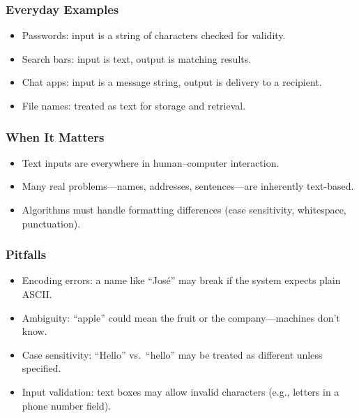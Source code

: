 \documentclass[
  letterpaper,
  DIV=11,
  numbers=noendperiod]{scrreprt}
\providecommand{\tightlist}{%
  \setlength{\itemsep}{0pt}\setlength{\parskip}{0pt}}
\begin{document}
\subsubsection{Everyday Examples}\label{everyday-examples-11}

\begin{itemize}
\tightlist
\item
  Passwords: input is a string of characters checked for validity.
\item
  Search bars: input is text, output is matching results.
\item
  Chat apps: input is a message string, output is delivery to a
  recipient.
\item
  File names: treated as text for storage and retrieval.
\end{itemize}

\subsubsection{When It Matters}\label{when-it-matters-10}

\begin{itemize}
\tightlist
\item
  Text inputs are everywhere in human--computer interaction.
\item
  Many real problems---names, addresses, sentences---are inherently
  text-based.
\item
  Algorithms must handle formatting differences (case sensitivity,
  whitespace, punctuation).
\end{itemize}

\subsubsection{Pitfalls}\label{pitfalls-9}

\begin{itemize}
\tightlist
\item
  Encoding errors: a name like ``José'' may break if the system expects
  plain ASCII.
\item
  Ambiguity: ``apple'' could mean the fruit or the company---machines
  don't know.
\item
  Case sensitivity: ``Hello'' vs.~``hello'' may be treated as different
  unless specified.
\item
  Input validation: text boxes may allow invalid characters (e.g.,
  letters in a phone number field).
\end{itemize}
\end{document}
